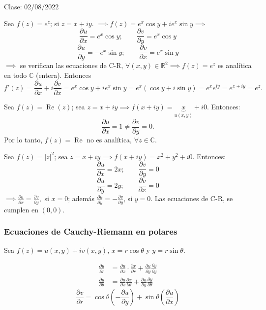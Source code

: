 Clase: 02/08/2022

\begin{ejemplo}
    Sea $f(z)=e^z$; si $z=x+iy$. $\implies f(z)=e^x\cos y + ie^x \sin y\implies$
    $$\frac{\partial u}{\partial x}=e^x\cos y;\qquad \frac{\partial v}{\partial y}=e^x\cos y$$
    $$\frac{\partial u}{\partial y}=-e^x \sin y;\qquad \frac{\partial v}{\partial x}=e^x\sin y$$
    $\implies$ se verifican las ecuaciones de C-R, $\forall(x,y)\in\mathbb{R}^2\implies f(z)=e^z$ es analítica en todo $\mathbb{C}$ (entera). Entonces $$f'(z)=\frac{\partial u}{\partial x}+i\frac{\partial v}{\partial x}=e^x \cos y +ie^x \sin y = e^x(\cos y +i\sin y)=e^xe^{iy}=e^{x+iy}=e^z.$$
\end{ejemplo}

\begin{ejemplo}
    Sea $f(z)=\operatorname{Re}(z)$; sea $z=x+iy\implies f(x+iy)=\underbrace{x}_{u(x,y)}+i0$. Entonces:
    $$\frac{\partial u}{\partial x}=1\neq \frac{\partial v}{\partial y}=0.$$
    Por lo tanto, $f(z)=\operatorname{Re}$ no es analítica, $\forall z\in \mathbb{C}$.
\end{ejemplo}

\begin{ejemplo}
    Sea $f(z)=|z|^2$; sea $z=x+iy\implies f(x+iy)=x^2+y^2+i0$. Entonces: 
    $$\frac{\partial u}{\partial x}=2x;\qquad \frac{\partial v}{\partial y}=0$$
    $$\frac{\partial u}{\partial y}=2y; \qquad \frac{\partial v}{\partial x}=0$$
    $\implies \frac{\partial u}{\partial x}=\frac{\partial v}{\partial y},$ si $x=0$; además $\frac{\partial u}{\partial y}=-\frac{\partial v}{\partial y}$, si $y=0$. Las ecuaciones de C-R, se cumplen en $(0,0)$.
\end{ejemplo}

\subsubsection{Ecuaciones de Cauchy-Riemann en polares}

Sea $f(z)=u(x,y)+iv(x,y)$, $x=r\cos \theta$ y $y=r\sin \theta$. 

\begin{align*}
    \frac{\partial u}{\partial r} &= \frac{\partial u}{\partial x}\cdot \frac{\partial x}{\partial r}+ \frac{\partial u}{\partial y}\frac{\partial y}{\partial y}\\
    \frac{\partial u}{\partial \theta} &= \frac{\partial u}{\partial x}\frac{\partial x}{\partial \theta}+\frac{\partial u}{\partial y}\frac{\partial y}{\partial \theta}
\end{align*}
$$\frac{\partial v}{\partial r}=\cos\theta \left(-\frac{\partial u}{\partial y}\right)+\sin \theta\left(\frac{\partial u}{\partial x}\right)$$

